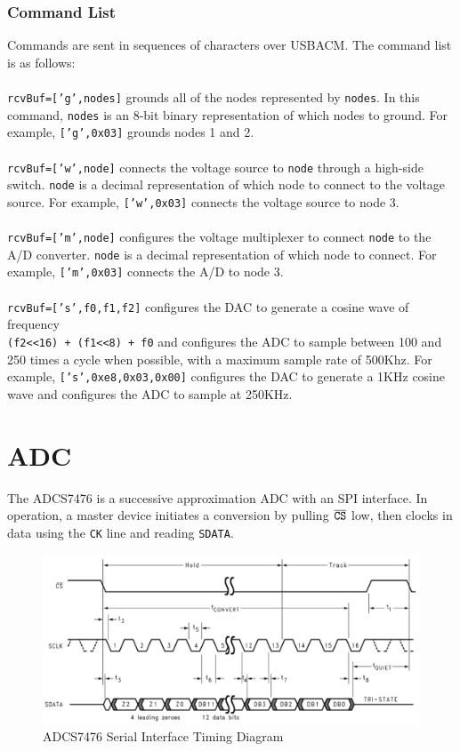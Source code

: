 \documentclass[11pt,twoside]{mitthesis}
\begin{document}
\subsubsection{Command List}
Commands are sent in sequences of characters over USBACM.
The command list is as follows:\\\\
\texttt{rcvBuf=['g',nodes]} grounds all of the nodes represented by \texttt{nodes}.
In this command, \texttt{nodes} is an 8-bit binary representation of which nodes to ground.
For example, \texttt{['g',0x03]} grounds nodes 1 and 2.\\\\
\texttt{rcvBuf=['w',node]} connects the voltage source to \texttt{node} through a high-side switch.
\texttt{node} is a decimal representation of which node to connect to the voltage source.
For example, \texttt{['w',0x03]} connects the voltage source to node 3.\\\\
\texttt{rcvBuf=['m',node]} configures the voltage multiplexer to connect \texttt{node} to the A/D converter.
\texttt{node} is a decimal representation of which node to connect.
For example, \texttt{['m',0x03]} connects the A/D to node 3.\\\\
\texttt{rcvBuf=['s',f0,f1,f2]} configures the DAC to generate a cosine wave of frequency\\ \texttt{(f2<<16) + (f1<<8) + f0} and configures the ADC to sample between 100 and 250 times a cycle when possible, with a maximum sample rate of 500Khz.
For example, \texttt{['s',0xe8,0x03,0x00]} configures the DAC to generate a 1KHz cosine wave and configures the ADC to sample at 250KHz.

\section{ADC}
The ADCS7476 is a successive approximation ADC with an SPI interface.  
In operation, a master device initiates a conversion by pulling $\overline{\mbox{\texttt{CS}}}$ low, then clocks in data using the \texttt{CK} line and reading \texttt{SDATA}.

\begin{figure}[h]
	\label{fig:adc-timing}
  \begin{center}
      \includegraphics[width=\textwidth]{../adc-timing.png}
      \caption{ADCS7476 Serial Interface Timing Diagram}
  \end{center}
\end{figure}
\end{document}
